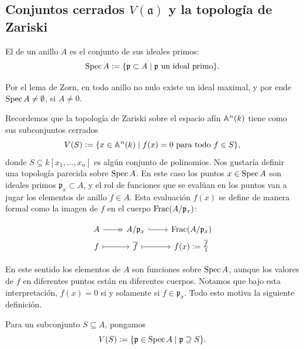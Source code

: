 \documentclass{article}
\numberwithin{equation}{section}
\theoremstyle{definition}
\begin{document}
\subsection{Conjuntos cerrados $V (\mathfrak{a})$ y la topología de Zariski}

\begin{definicion}
  \label{dfn:Spec}
  El  de un anillo $A$ es el conjunto de sus ideales primos:
  \[ \Spec A \dfn \{ \mathfrak{p} \subset A \mid
                     \mathfrak{p}\text{ un ideal primo} \}. \]
\end{definicion}

Por el lema de Zorn, en todo anillo no nulo existe un ideal maximal, y por ende
${\Spec A \ne \emptyset}$, si $A \ne 0$.

\begin{digresion}
  \label{comentario:evaluacion-en-Spec}
  Recordemos que la topología de Zariski sobre el espacio afín $\AA^n (k)$ tiene
  como sus subconjuntos cerrados
  $$V (S) \dfn \{ x \in \AA^n (k) \mid f (x) = 0 \text{ para todo }f\in S \},$$
  donde $S \subseteq k [x_1,\ldots,x_n]$ es algún conjunto de polinomios.
  Nos gustaría definir una topología parecida sobre $\Spec A$. En este caso
  los puntos $x \in \Spec A$ son ideales primos $\mathfrak{p}_x \subset A$,
  y el rol de funciones que se evalúan en los puntos van a jugar los elementos
  de anillo $f \in A$. Esta evaluación $f (x)$ se define de manera formal como
  la imagen de $f$ en el cuerpo $\Frac (A/\mathfrak{p}_x)$:

  \[ \begin{tikzcd}[row sep=0pt]
      A \ar[->>]{r} & A/\mathfrak{p}_x \ar[hookrightarrow]{r} & \Frac (A/\mathfrak{p}_x) \\
      f \ar[|->]{r} & \overline{f} \ar[|->]{r} & f (x) \dfn \frac{\overline{f}}{1}
    \end{tikzcd} \]

  En este sentido los elementos de $A$ son funciones sobre $\Spec A$, aunque
  los valores de $f$ en diferentes puntos están en diferentes cuerpos. Notamos
  que bajo esta interpretación, $f (x) = 0$ si y solamente si
  $f \in \mathfrak{p}_x$. Todo esto motiva la siguiente definición.
\end{digresion}

\begin{definicion}
  \label{dfn:cerrados-V}
  Para un subconjunto $S \subseteq A$, pongamos
  $$V (S) \dfn \{ \mathfrak{p} \in \Spec A \mid \mathfrak{p} \supseteq S \}.$$
\end{definicion}
\end{document}
